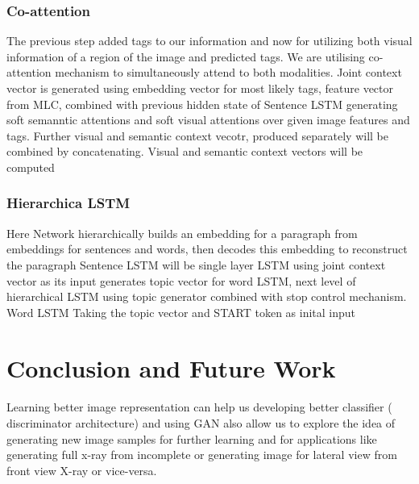 \documentclass[12pt]{article}
\numberwithin{figure}{section}
\begin{document}
\paragraph{}
\subsubsection{Co-attention}
The previous step added tags to our information and now for utilizing both visual information of a region of the image and predicted tags. We are utilising co-attention mechanism to simultaneously attend to both modalities.
Joint context vector is generated using embedding vector for most likely tags, feature vector from MLC, combined with previous hidden state of Sentence LSTM generating soft semanntic attentions and soft visual attentions over given image features and tags. Further visual and semantic context vecotr, produced separately will be combined by concatenating.
Visual and semantic context vectors will be computed
\paragraph{}
\subsubsection{Hierarchica LSTM}
Here Network hierarchically builds an embedding for a paragraph from embeddings for sentences and words, then decodes this embedding to reconstruct the paragraph
{Sentence LSTM} will be single layer LSTM using joint context vector as its input generates topic vector for word LSTM, next level of hierarchical LSTM using topic generator combined with stop control mechanism.
Word LSTM Taking the topic vector and START token as inital input 
\paragraph{}

\section{Conclusion and Future Work}
\paragraph{}
Learning better image  representation can help us developing better classifier ( discriminator architecture) and using GAN also allow us to explore the idea of generating new image samples for further learning and for applications like generating full x-ray from incomplete or generating image for lateral view from front view X-ray or vice-versa. 
\end{document}
